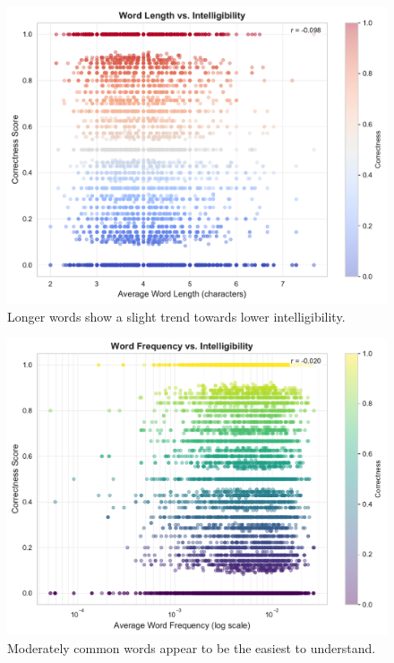 \documentclass[conference]{IEEEtran}
\begin{document}
\begin{figure}[htbp]
    \centering
    \includegraphics[width=\columnwidth]{plots_assignment_1/figure_3_word_length.pdf}
    \caption{Longer words show a slight trend towards lower intelligibility.}
    \label{fig:word_length}
\end{figure}

\begin{figure}[htbp]
    \centering
    \includegraphics[width=\columnwidth]{plots_assignment_1/figure_4_word_frequency.pdf}
    \caption{Moderately common words appear to be the easiest to understand.}
    \label{fig:word_freq}
\end{figure}
\end{document}
